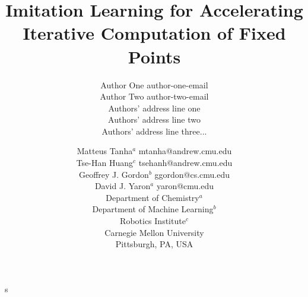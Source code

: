 \documentclass[twoside,11pt]{article}
\begin{document}
\title{Imitation Learning for Accelerating Iterative Computation of Fixed Points}

\author{\name Author One \email author-one-email\\ 
\name Author Two \email author-two-email\\ 
\addr Authors' address line one\\ 
Authors' address line two\\ 
Authors' address line three...}

\author{\name Matteus Tanha$^a$ \email mtanha@andrew.cmu.edu \\
\name Tse-Han Huang$^c$ \email tsehanh@andrew.cmu.edu \\
\name Geoffrey J. Gordon$^b$ \email ggordon@cs.cmu.edu \\
\name David J. Yaron$^a$ \email yaron@cmu.edu\\
       \addr Department of Chemistry$^a$\\
       Department of Machine Learning$^b$\\
       Robotics Institute$^c$\\
       Carnegie Mellon University \\
       Pittsburgh, PA, USA}s

\maketitle

\end{document}
